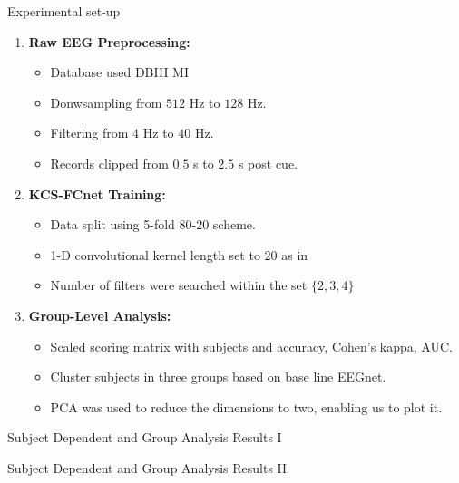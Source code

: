 \documentclass[aspectratio=169]{beamer}
\let\oldcite\cite %
\renewcommand{\cite}[1]{{\tiny\oldcite{#1}}}
\begin{document}
\begin{frame}{Experimental set-up}
    \begin{enumerate}
        \item \textbf{Raw EEG Preprocessing:} 
        \begin{itemize}
            \item Database used DBIII MI
            \item Donwsampling from $512$ Hz to $128$ Hz. 
            \item Filtering from $4$ Hz to $40$ Hz. 
            \item Records clipped from $0.5$ s to $2.5$ s post cue.
        \end{itemize}
        \item \textbf{KCS-FCnet Training:}
        \begin{itemize}
            \item Data split using 5-fold 80-20 scheme.
            \item 1-D convolutional kernel length set to $20$ as in \cite{lawhern2018eegnet}
            \item Number of filters were searched within the set $\{2,3,4\}$
        \end{itemize}
        \item \textbf{Group-Level Analysis:}
        \begin{itemize}
            \item Scaled scoring matrix with subjects and accuracy, Cohen's kappa, AUC.
            \item Cluster subjects in three groups based on base line EEGnet.
            \item PCA was used to reduce the dimensions to two, enabling us to plot it.
        \end{itemize}
    \end{enumerate}
\end{frame}

\begin{frame}{Subject Dependent and Group Analysis Results I}
    \centering
    \resizebox{0.7\linewidth}{!}{}
\end{frame}

\begin{frame}{Subject Dependent and Group Analysis Results II}
    \centering
    \resizebox{0.7\linewidth}{!}{}
\end{frame}
\end{document}
